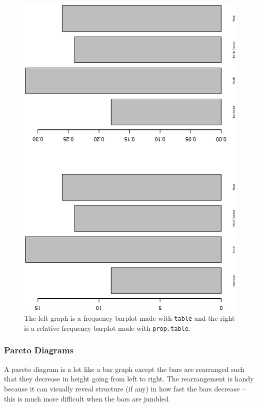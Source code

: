 \documentclass[captions=tableheading]{scrbook}
\begin{document}
\begin{example}
\begin{figure}[th]
  \includegraphics[angle=270, totalheight=4in]{ps/datadesc/bar-gr-stateregion.ps}
  \caption[Bar graphs of the \texttt{state.region} data]{\small The left graph is a frequency barplot made with \texttt{table} and the right is a relative frequency barplot made with \texttt{prop.table}.}
  \label{fig-bar-gr-stateregion}
\end{figure}


\end{example}
\subsubsection{Pareto Diagrams}
\label{sec-3-1-4-3}
\label{par:Pareto-Diagrams}


A pareto diagram is a lot like a bar graph except the bars are rearranged such that they decrease in height going from left to right. The rearrangement is handy because it can visually reveal structure (if any) in how fast the bars decrease -- this is much more difficult when the bars are jumbled. 
\end{document}
